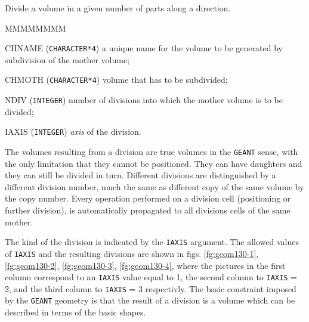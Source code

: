              


Divide a volume in a given number of parts along a direction. 

\begin{DLtt}{MMMMMMMM}
\item[CHNAME] ({\tt CHARACTER*4}) a unique name for the volume to be generated
by subdivision of the mother volume;
\item[CHMOTH] ({\tt CHARACTER*4}) volume that has to be subdivided;
\item[NDIV] ({\tt INTEGER}) number of divisions into which the mother volume 
is to be divided;
\item[IAXIS] ({\tt INTEGER}) {\it axis} of the division.
\end{DLtt}

The volumes resulting from a division are true volumes in
the {\tt GEANT} sense, with the only limitation that they cannot be
positioned. They can have daughters and they can still be divided in turn.
Different divisions are distinguished by a different division number,
much the same as different copy of the same volume by the copy number.
Every operation performed on a division cell (positioning or further division),
is automatically propagated to all divisions cells of the same mother.

The kind of the division is indicated by the {\tt IAXIS} argument. 
The
allowed values of {\tt IAXIS} and the resulting divisions are shown in
figs. \ref{fg:geom130-1}, \ref{fg:geom130-2}, \ref{fg:geom130-3}, 
\ref{fg:geom130-4}, where the pictures in the first column correspond to 
an {\tt IAXIS} value equal to 1, the second column to {\tt IAXIS} = 2, 
and the third column to {\tt IAXIS} = 3 respectivly.
The
basic constraint imposed by the {\tt GEANT} geometry is that the result
of a division is a volume which can be described in terms of the basic 
shapes.

